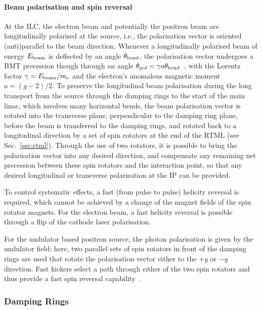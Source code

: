 \paragraph{Beam polarisation and spin reversal}
\label{par:beampol}

At the ILC, the electron beam and potentially the positron beam are longitudinally polarised at the source, i.e., the polarisation vector is oriented (anti)parallel to the beam direction.
Whenever a longitudinally polarised beam of energy $E_{\mathrm{beam}}$ is deflected by an angle $\theta_{\mathrm{bend}}$, the polarisation vector undergoes a BMT precession though through an angle $\theta_{\mathrm{pol}} =  \gamma a \theta_{\mathrm{bend}}$~\cite{Moffeit:2005pb}, 
with the Lorentz factor $\gamma = E_{\mathrm{beam}}/m_{\mathrm{e}}$ and the electron's anomalous magnetic moment $a = (g-2)/2$. 
To preserve the longitudinal beam polarisation during the long transport from the source through the damping rings to the start of the main linac, which involves many horizontal bends, the beam polarisation vector is rotated into the transverse plane, perpendicular to the damping ring plane, before the beam is transferred to the damping rings, and rotated back to a longitudinal direction by a set of spin rotators at the end of the RTML (see Sec.~\ref{sec:rtml}).
Through the use of two rotators, it is possible to bring the polarisation vector into any desired direction, and compensate any remaining net precession between these spin rotators and the interaction point, so that any desired longitudinal or transverse polarisation at the IP can be provided.

To control systematic effects, a fast (from pulse to pulse) helicity reversal is required, which cannot be achieved by a change of the magnet fields of the spin rotator magnets.
For the electron beam, a fast helicity reversal is possible through a flip of the cathode laser polarisation.

For the undulator based positron source, the photon polarisation is given by the undulator field; here, two parallel sets of spin rotators in front of the damping rings are used that rotate the polarisation vector either to the $+y$ or $-y$ direction. 
Fast kickers select a path through either of the two spin rotators and thus provide a fast spin reversal capability~\cite{Moffeit:2005pb,Malysheva:2016jdr}.




\subsubsection{Damping Rings}

